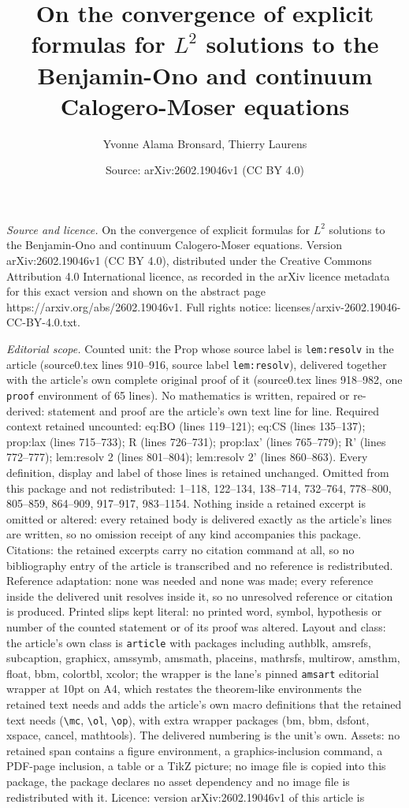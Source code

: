 \documentclass[10pt,a4paper]{amsart}
\title[On the convergence of explicit formulas for $L^2$ solutions ]{On the convergence of explicit formulas for $L^2$ solutions to the Benjamin-Ono and continuum Calogero-Moser equations}
\author{Yvonne Alama Bronsard, Thierry Laurens}
\date{Source: arXiv:2602.19046v1 (CC BY 4.0)}
\begin{document}
\maketitle

\noindent\emph{Source and licence.} On the convergence of explicit formulas for $L^2$ solutions to the Benjamin-Ono and continuum Calogero-Moser equations. Version arXiv:2602.19046v1 (CC BY 4.0), distributed under the Creative Commons Attribution 4.0 International licence, as recorded in the arXiv licence metadata for this exact version and shown on the abstract page https://arxiv.org/abs/2602.19046v1. Full rights notice: licenses/arxiv-2602.19046-CC-BY-4.0.txt.\par\smallskip

\noindent\textit{Editorial scope.} Counted unit: the Prop whose source label is \texttt{lem:resolv} in the article (source0.tex lines 910--916, source label \texttt{lem:resolv}), delivered together with the article's own complete original proof of it (source0.tex lines 918--982, one \texttt{proof} environment of 65 lines). No mathematics is written, repaired or re-derived: statement and proof are the article's own text line for line. Required context retained uncounted: eq:BO (lines 119--121); eq:CS (lines 135--137); prop:lax (lines 715--733); R (lines 726--731); prop:lax' (lines 765--779); R' (lines 772--777); lem:resolv 2 (lines 801--804); lem:resolv 2' (lines 860--863). Every definition, display and label of those lines is retained unchanged. Omitted from this package and not redistributed: 1--118, 122--134, 138--714, 732--764, 778--800, 805--859, 864--909, 917--917, 983--1154. Nothing inside a retained excerpt is omitted or altered: every retained body is delivered exactly as the article's lines are written, so no omission receipt of any kind accompanies this package. Citations: the retained excerpts carry no citation command at all, so no bibliography entry of the article is transcribed and no reference is redistributed. Reference adaptation: none was needed and none was made; every reference inside the delivered unit resolves inside it, so no unresolved reference or citation is produced. Printed slips kept literal: no printed word, symbol, hypothesis or number of the counted statement or of its proof was altered. Layout and class: the article's own class is \texttt{article} with packages including authblk, amsrefs, subcaption, graphicx, amssymb, amsmath, placeins, mathrsfs, multirow, amsthm, float, bbm, colortbl, xcolor; the wrapper is the lane's pinned \texttt{amsart} editorial wrapper at 10pt on A4, which restates the theorem-like environments the retained text needs and adds the article's own macro definitions that the retained text needs (\texttt{\textbackslash mc}, \texttt{\textbackslash ol}, \texttt{\textbackslash op}), with extra wrapper packages (bm, bbm, dsfont, xspace, cancel, mathtools). The delivered numbering is the unit's own. Assets: no retained span contains a figure environment, a graphics-inclusion command, a PDF-page inclusion, a table or a TikZ picture; no image file is copied into this package, the package declares no asset dependency and no image file is redistributed with it. Licence: version arXiv:2602.19046v1 of this article is 
\end{document}
